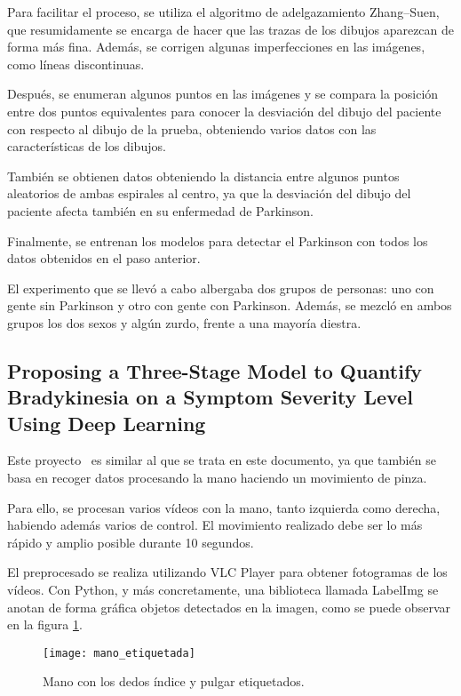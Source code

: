 Para facilitar el proceso, se utiliza el algoritmo de adelgazamiento Zhang–Suen, que resumidamente se encarga de hacer que las trazas de los dibujos aparezcan de forma más fina. Además, se corrigen algunas imperfecciones en las imágenes, como líneas discontinuas.

Después, se enumeran algunos puntos en las imágenes y se compara la posición entre dos puntos equivalentes para conocer la desviación del dibujo del paciente con respecto al dibujo de la prueba, obteniendo varios datos con las características de los dibujos. 

También se obtienen datos obteniendo la distancia entre algunos puntos aleatorios de ambas espirales al centro, ya que la desviación del dibujo del paciente afecta también en su enfermedad de Parkinson.

Finalmente, se entrenan los modelos para detectar el Parkinson con todos los datos obtenidos en el paso anterior.

El experimento que se llevó a cabo albergaba dos grupos de personas: uno con gente sin Parkinson y otro con gente con Parkinson. Además, se mezcló en ambos grupos los dos sexos y algún zurdo, frente a una mayoría diestra.

\subsection{Proposing a Three-Stage Model to Quantify
	Bradykinesia on a Symptom Severity Level
	Using Deep Learning}
Este proyecto~\cite{jaber2021proposing} es similar al que se trata en este documento, ya que también se basa en recoger datos procesando la mano haciendo un movimiento de pinza.

Para ello, se procesan varios vídeos con la mano, tanto izquierda como derecha, habiendo además varios de control. El movimiento realizado debe ser lo más rápido y amplio posible durante 10 segundos.

El preprocesado se realiza utilizando VLC Player para obtener fotogramas de los vídeos. Con Python, y más concretamente, una biblioteca llamada LabelImg se anotan de forma gráfica objetos detectados en la imagen, como se puede observar en la figura \ref{manoetiquetada}.

\begin{figure}[]
	\texttt{[image: mano\_etiquetada]}
	\caption{Mano con los dedos índice y pulgar etiquetados.\cite{jaber2021proposing}}
	\label{manoetiquetada}
\end{figure}

